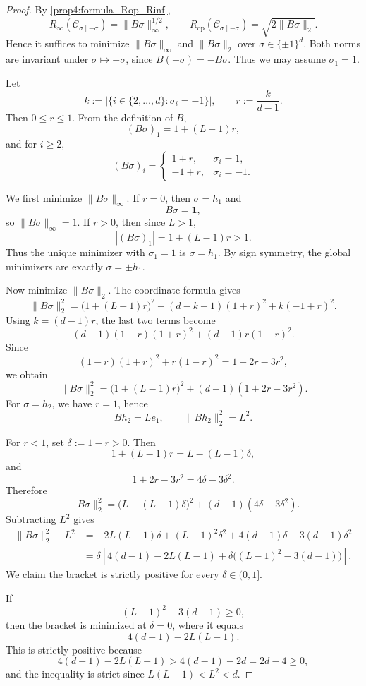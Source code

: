 \documentclass{article}
\begin{document}
\begin{proof}
By \cref{prop4:formula_Rop_Rinf},
\[
R_\infty(\mathcal C_{\sigma\mid-\sigma})
=
\|B\sigma\|_\infty^{1/2},
\qquad
R_{\mathrm{op}}(\mathcal C_{\sigma\mid-\sigma})
=
\sqrt{2\|B\sigma\|_2}.
\]
Hence it suffices to minimize $\|B\sigma\|_\infty$ and $\|B\sigma\|_2$ over
$\sigma\in\{\pm1\}^d$.
Both norms are invariant under $\sigma\mapsto-\sigma$, since
$B(-\sigma)=-B\sigma$. Thus we may assume $\sigma_1=1$.

Let
\[
k:=|\{i\in\{2,\dots,d\}:\sigma_i=-1\}|,
\qquad
r:=\frac{k}{d-1}.
\]
Then $0\le r\le1$. From the definition of $B$,
\[
(B\sigma)_1=1+(L-1)r,
\]
and for $i\ge2$,
\[
(B\sigma)_i=
\begin{cases}
1+r, & \sigma_i=1,\\
-1+r, & \sigma_i=-1.
\end{cases}
\]

We first minimize $\|B\sigma\|_\infty$. If $r=0$, then $\sigma=h_1$ and
\[
B\sigma=\mathbf 1,
\]
so $\|B\sigma\|_\infty=1$. If $r>0$, then since $L>1$,
\[
|(B\sigma)_1|=1+(L-1)r>1.
\]
Thus the unique minimizer with $\sigma_1=1$ is $\sigma=h_1$. By sign symmetry,
the global minimizers are exactly $\sigma=\pm h_1$.

Now minimize $\|B\sigma\|_2$. The coordinate formula gives
\[
\|B\sigma\|_2^2
=
\bigl(1+(L-1)r\bigr)^2
+
(d-k-1)(1+r)^2
+
k(-1+r)^2.
\]
Using $k=(d-1)r$, the last two terms become
\[
(d-1)(1-r)(1+r)^2+(d-1)r(1-r)^2.
\]
Since
\[
(1-r)(1+r)^2+r(1-r)^2
=
1+2r-3r^2,
\]
we obtain
\[
\|B\sigma\|_2^2
=
\bigl(1+(L-1)r\bigr)^2
+
(d-1)(1+2r-3r^2).
\]
For $\sigma=h_2$, we have $r=1$, hence
\[
Bh_2=Le_1,
\qquad
\|Bh_2\|_2^2=L^2.
\]

For $r<1$, set $\delta:=1-r>0$. Then
\[
1+(L-1)r
=
L-(L-1)\delta,
\]
and
\[
1+2r-3r^2
=
4\delta-3\delta^2.
\]
Therefore
\[
\|B\sigma\|_2^2
=
\bigl(L-(L-1)\delta\bigr)^2
+
(d-1)(4\delta-3\delta^2).
\]
Subtracting $L^2$ gives
\[
\begin{aligned}
\|B\sigma\|_2^2-L^2
&=
-2L(L-1)\delta
+
(L-1)^2\delta^2
+
4(d-1)\delta
-
3(d-1)\delta^2
\\
&=
\delta
\left[
4(d-1)-2L(L-1)
+
\delta\bigl((L-1)^2-3(d-1)\bigr)
\right].
\end{aligned}
\]
We claim the bracket is strictly positive for every $\delta\in(0,1]$.

If
\[
(L-1)^2-3(d-1)\ge0,
\]
then the bracket is minimized at $\delta=0$, where it equals
\[
4(d-1)-2L(L-1).
\]
This is strictly positive because
\[
4(d-1)-2L(L-1)
>
4(d-1)-2d
=
2d-4
\ge0,
\]
and the inequality is strict since $L(L-1)<L^2<d$.


\end{proof}
\end{document}
